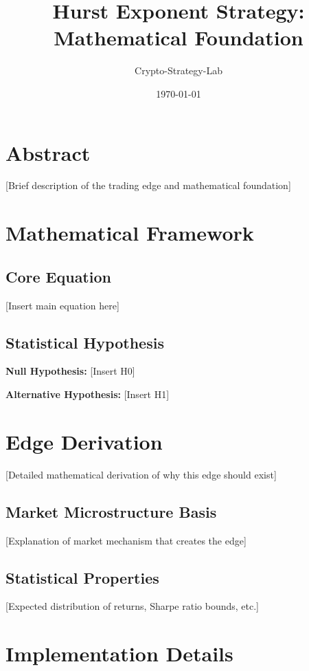 \documentclass{article}
\title{Hurst Exponent Strategy: Mathematical Foundation}
\author{Crypto-Strategy-Lab}
\date{\today}
\begin{document}
\maketitle

\section{Abstract}

[Brief description of the trading edge and mathematical foundation]

\section{Mathematical Framework}

\subsection{Core Equation}

[Insert main equation here]

\subsection{Statistical Hypothesis}

\textbf{Null Hypothesis:} [Insert H0]

\textbf{Alternative Hypothesis:} [Insert H1]

\section{Edge Derivation}

[Detailed mathematical derivation of why this edge should exist]

\subsection{Market Microstructure Basis}

[Explanation of market mechanism that creates the edge]

\subsection{Statistical Properties}

[Expected distribution of returns, Sharpe ratio bounds, etc.]

\section{Implementation Details}
\end{document}
